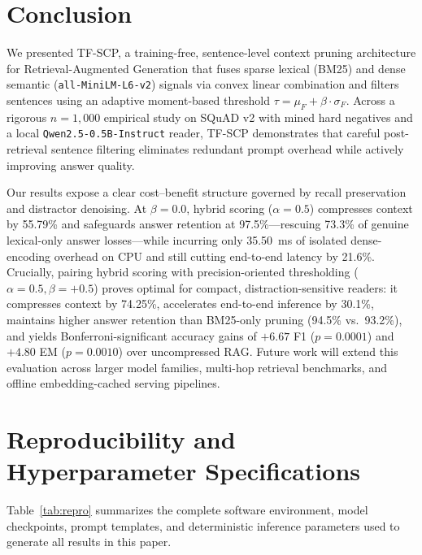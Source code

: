 \documentclass[conference]{IEEEtran}
\begin{document}
\section{Conclusion}

We presented TF-SCP, a training-free, sentence-level context pruning architecture for Retrieval-Augmented Generation that fuses sparse lexical (BM25) and dense semantic (\texttt{all-MiniLM-L6-v2}) signals via convex linear combination and filters sentences using an adaptive moment-based threshold $\tau = \mu_F + \beta \cdot \sigma_F$. Across a rigorous $n = 1,000$ empirical study on SQuAD v2 with mined hard negatives and a local \texttt{Qwen2.5-0.5B-Instruct} reader, TF-SCP demonstrates that careful post-retrieval sentence filtering eliminates redundant prompt overhead while actively improving answer quality.

Our results expose a clear cost--benefit structure governed by recall preservation and distractor denoising. At $\beta = 0.0$, hybrid scoring ($\alpha = 0.5$) compresses context by 55.79\% and safeguards answer retention at 97.5\%---rescuing 73.3\% of genuine lexical-only answer losses---while incurring only 35.50~ms of isolated dense-encoding overhead on CPU and still cutting end-to-end latency by 21.6\%. Crucially, pairing hybrid scoring with precision-oriented thresholding ($\alpha = 0.5, \beta = +0.5$) proves optimal for compact, distraction-sensitive readers: it compresses context by 74.25\%, accelerates end-to-end inference by 30.1\%, maintains higher answer retention than BM25-only pruning (94.5\% vs.\ 93.2\%), and yields Bonferroni-significant accuracy gains of $+6.67$ F1 ($p = 0.0001$) and $+4.80$ EM ($p = 0.0010$) over uncompressed RAG. Future work will extend this evaluation across larger model families, multi-hop retrieval benchmarks, and offline embedding-cached serving pipelines.

\appendices

\section{Reproducibility and Hyperparameter Specifications}

Table~\ref{tab:repro} summarizes the complete software environment, model checkpoints, prompt templates, and deterministic inference parameters used to generate all results in this paper.
\end{document}
